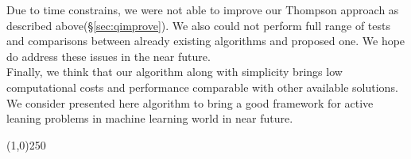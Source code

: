 \documentclass[12pt, a4paper, pdflatex, leqno]{report}
\begin{document}
Due to time constrains, we were not able to improve our Thompson approach as described above(\S\ref{sec:qimprove}). We also could not perform full range of tests and comparisons between already existing algorithms and proposed one. We hope do address these issues in the near future.\\

Finally, we think that our algorithm along with simplicity brings low computational costs and performance comparable with other available solutions. We consider presented here algorithm to bring a good framework for active leaning problems in machine learning world in near future.\\

\begin{center}
\noindent \line(1,0){250}
\end{center}



{}
% 









\end{document}
